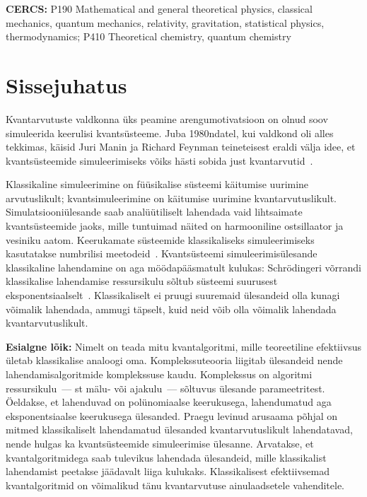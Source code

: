 \documentclass[12pt]{report}
\begin{document}
\noindent\textbf{CERCS:}
P190 Mathematical and general theoretical physics, classical mechanics, quantum
mechanics, relativity, gravitation, statistical physics, thermodynamics; P410 Theoretical chemistry, quantum chemistry

\tableofcontents

\chapter{Sissejuhatus}

Kvantarvutuste valdkonna üks peamine arengumotivatsioon on olnud soov simuleerida keerulisi kvantsüsteeme.
Juba 1980ndatel, kui valdkond oli alles tekkimas, käisid Juri Manin ja Richard Feynman teineteisest eraldi välja idee, et kvantsüsteemide simuleerimiseks võiks hästi sobida just kvantarvutid~\cite{manin, feynman}.

Klassikaline simuleerimine on füüsikalise süsteemi käitumise uurimine arvutuslikult; kvantsimuleerimine on käitumise uurimine kvantarvutuslikult.
Simulatsiooniülesande saab analüütiliselt lahendada vaid lihtsaimate kvantsüsteemide jaoks, mille tuntuimad näited on harmooniline ostsillaator ja vesiniku aatom.
Keerukamate süsteemide klassikaliseks simuleerimiseks kasutatakse numbrilisi meetodeid~\cite{szabo+ostlund, whitfield+etal2011}.
Kvantsüsteemi simuleerimisülesande klassikaline lahendamine on aga möödapääsmatult kulukas: Schrödingeri võrrandi klassikalise lahendamise ressursikulu sõltub süsteemi suurusest eksponentsiaalselt~\cite{whitfield+etal2011, mcardle+etal, cao+etal, kassal+etal}.
Klassikaliselt ei pruugi suuremaid ülesandeid olla kunagi võimalik lahendada, ammugi täpselt, kuid neid võib olla võimalik lahendada kvantarvutuslikult.

{\bf Esialgne lõik:}
Nimelt on teada mitu kvantalgoritmi, mille teoreetiline efektiivsus ületab klassikalise analoogi oma.
Komplekssuteooria liigitab ülesandeid nende lahendamisalgoritmide komplekssuse kaudu.
Komplekssus on algoritmi ressursikulu~--- st mälu- või ajakulu~--- sõltuvus ülesande parameetritest.
Öeldakse, et lahenduvad on polünomiaalse keerukusega, lahendumatud aga eksponentsiaalse keerukusega ülesanded.
Praegu levinud arusaama põhjal on mitmed klassikaliselt lahendamatud ülesanded kvantarvutuslikult lahendatavad, nende hulgas ka kvantsüsteemide simuleerimise ülesanne.
Arvatakse, et kvantalgoritmidega saab tulevikus lahendada ülesandeid, mille klassikalist lahendamist peetakse jäädavalt liiga kulukaks.
Klassikalisest efektiivsemad kvantalgoritmid on võimalikud tänu kvantarvutuse ainulaadsetele vahenditele.
\end{document}
